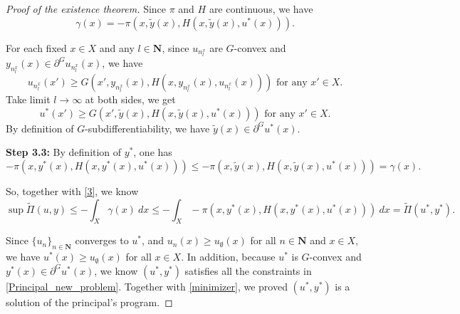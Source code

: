 \documentclass[a4paper, 11pt]{amsart}
\numberwithin{equation}{section}
\theoremstyle{plain}
\theoremstyle{definition}
\theoremstyle{remark}
\newcommand{\N}{\mathbf{N}}
\begin{document}
\begin{proof}[Proof of the existence theorem]
	Since $\pi$ and $H$ are continuous, we have 
	$$ \gamma(x)= - \pi(x, \tilde{y}(x), H(x,\tilde{y}(x),u^*(x))).$$
	
	For each fixed $x\in X$ and any $l \in \N$, since $u_{n_l^x}$ are $G$-convex and $y_{n_l^x}(x) \in \partial^G u_{n_l^x}(x)$, we have 
	$$u_{n_l^x}(x')\ge G(x', y_{n_l^x}(x),H(x,y_{n_l^x}(x),u_{n_l^x}(x))) \text{  for any $x' \in X$}.$$ 
	Take limit $l \rightarrow \infty$ at both sides, we get 
	$$u^*(x')\ge G(x', \tilde{y}(x),H(x,\tilde{y}(x),u^*(x))) \text{ for any $x'\in X$.}$$
	 By definition of $G$-subdifferentiability, we have $\tilde{y}(x)\in \partial^Gu^*(x)$. \medskip





{\bf Step 3.3: } By definition of $y^*$, one has $$ -\pi(x, y^*(x), H(x,y^*(x),u^*(x)))\le   -\pi(x, \tilde{y}(x), H(x,\tilde{y}(x),u^*(x))) = \gamma(x).$$
	
So, together with \eqref{3}, we know 
\begin{equation}\label{minimizer}
	\sup \tilde{\Pi}(u,y) \le - \int_{X}  \gamma(x) ~dx \le - \int_{X}  - \pi(x, y^*(x), H(x,y^*(x),u^*(x))) ~dx = \tilde{\Pi}(u^*,y^*).
\end{equation}


Since $\{u_n\}_{n\in \N}$ converges to $u^*$, and $u_n(x)\ge u_{\emptyset}(x)$ for all $n\in \N$ and $x \in X$, we have $u^*(x)\ge u_{\emptyset}(x)$ for all $x \in X$. In addition, because $u^*$ is $G$-convex and $y^*(x) \in \partial^G u^*(x)$, we know $(u^*, y^*)$ satisfies all the constraints in \eqref{Principal_new_problem}. Together with \eqref{minimizer}, we proved $(u^*,y^*)$ is a solution of the principal's program.
\end{proof}



\bigskip











\end{document}
